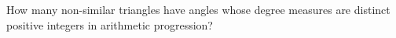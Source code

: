 How many non-similar triangles have angles whose degree measures are distinct positive integers in arithmetic progression?
